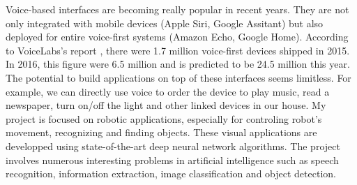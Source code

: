 Voice-based interfaces are becoming really popular in recent years. They are not only integrated with mobile devices (Apple Siri, Google Assitant) but also deployed for entire voice-first systems (Amazon Echo, Google Home). According to VoiceLabs's report \cite{VoiceLabs:2017}, there were 1.7 million voice-first devices shipped in 2015. In 2016, this figure were 6.5 million and is predicted to be 24.5 million this year. The potential to build applications on top of these interfaces seems limitless. For example, we can directly use voice to order the device to play music, read a newspaper, turn on/off the light and other linked devices in our house. My project is focused on robotic applications, especially for controling robot's movement, recognizing and finding objects. These visual applications are developped using state-of-the-art deep neural network algorithms. The project involves numerous interesting problems in artificial intelligence such as speech recognition, information extraction, image classification and object detection.


